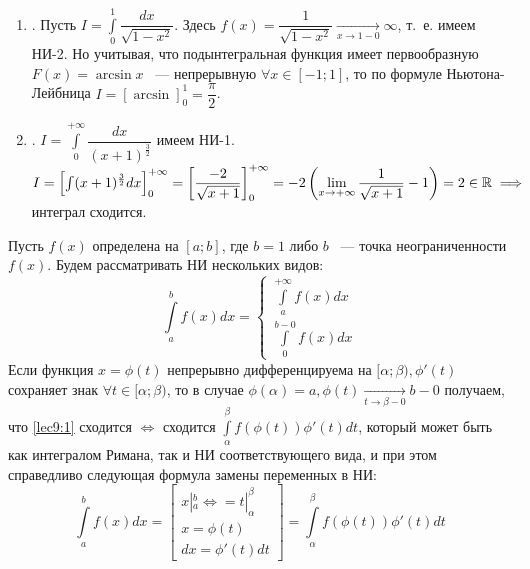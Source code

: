 \documentclass[../../main.tex]{subfiles}
\begin{document}
\begin{exmps}
\begin{enumerate}
	\item. Пусть $ I = \int\limits_{0}^1 \dfrac{dx}{\sqrt{1 - x^2}} $.
	Здесь $ f(x) = \dfrac{1}{\sqrt{1 - x^2}} \underset{x \to 1 - 0}{\to}
	\infty $, т.~е. имеем НИ-2. Но учитывая, что подынтегральная функция 
	имеет первообразную $ F(x) = \arcsin{x} $ ~--- непрерывную $ \forall x
	\in [-1; 1] $, то по формуле Ньютона-Лейбница $ 
	I = \left[\arcsin \right]_0^1 = \dfrac{\pi}{2} $.
	\item. $ I = \int\limits_{0}^{+\infty} \dfrac{dx}{(x + 1)^{\frac{3}{2}}}$
	имеем НИ-1. $ I = \left[ \int (x + 1)^{\frac{3}{2}} dx\right]_0^{+\infty} 
	= \left[ \dfrac{-2}{\sqrt{x + 1}} \right]_0^{+\infty} = -2 \left(
	\lim\limits_{x \to + \infty} \dfrac{1}{\sqrt{x + 1}} - 1 \right) = 2
	\in \mathbb{R} \implies $ интеграл сходится.
\end{enumerate}
\end{exmps}
\begin{thm}
	Пусть $ f(x) $ определена на $ [a; b] $, где $ b = 1 $ либо $ b $ ~---
	точка неограниченности $ f(x) $. %
	Будем рассматривать НИ нескольких видов:
	\begin{equation}
		\label{lec9:1}
		\int\limits_a^b f(x) dx = 
		\begin{cases}
			\int\limits_a^{+\infty} f(x) dx\\
			\int\limits_{0}^{b - 0} f(x) dx
		\end{cases}
	\end{equation}
	Если функция $ x = \phi(t) $ непрерывно дифференцируема на $ [\alpha; \beta)
	, \phi'(t) $ сохраняет знак $ \forall t \in [\alpha; \beta) $, то
	в случае $ \phi(\alpha) = a, \phi(t) \underset{t \to \beta - 0}{\to} b - 0
	$ получаем, что \eqref{lec9:1} сходится $\iff$ сходится
	$ \int\limits_\alpha^\beta f(\phi(t)) \phi'(t) dt $, который может быть как
	интегралом Римана, так и НИ соответствующего вида, и при этом справедливо 
	следующая формула замены переменных в НИ:
	\begin{equation}
		\label{lec9:2}
		\int\limits_a^b f(x) dx = 
		\begin{bmatrix}
			x|_a^b \iff= t|_\alpha^\beta\\
			x = \phi(t)\\
			dx = \phi'(t)dt
		\end{bmatrix} =
		\int\limits_\alpha^\beta f(\phi(t)) \phi'(t) dt
	\end{equation}
\end{thm}
\end{document}
